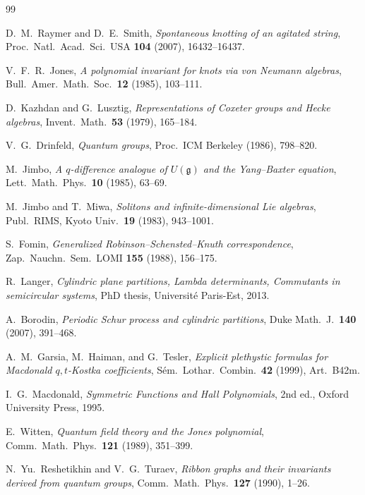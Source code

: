 \documentclass[12pt]{article}
\begin{document}
\begin{thebibliography}{99}

D.~M.~Raymer and D.~E.~Smith,
\emph{Spontaneous knotting of an agitated string},
Proc.\ Natl.\ Acad.\ Sci.\ USA \textbf{104} (2007), 16432--16437.

V.~F.~R.~Jones,
\emph{A polynomial invariant for knots via von Neumann algebras},
Bull.\ Amer.\ Math.\ Soc.\ \textbf{12} (1985), 103--111.

D.~Kazhdan and G.~Lusztig,
\emph{Representations of Coxeter groups and Hecke algebras},
Invent.\ Math.\ \textbf{53} (1979), 165--184.

V.~G.~Drinfeld,
\emph{Quantum groups},
Proc.\ ICM Berkeley (1986), 798--820.

M.~Jimbo,
\emph{A $q$-difference analogue of $U(\mathfrak{g})$ and the Yang--Baxter equation},
Lett.\ Math.\ Phys.\ \textbf{10} (1985), 63--69.

M.~Jimbo and T.~Miwa,
\emph{Solitons and infinite-dimensional Lie algebras},
Publ.\ RIMS, Kyoto Univ.\ \textbf{19} (1983), 943--1001.

S.~Fomin,
\emph{Generalized Robinson--Schensted--Knuth correspondence},
Zap.\ Nauchn.\ Sem.\ LOMI \textbf{155} (1988), 156--175.

R.~Langer,
\emph{Cylindric plane partitions, Lambda determinants, Commutants in semicircular systems},
PhD thesis, Universit\'e Paris-Est, 2013.

A.~Borodin,
\emph{Periodic Schur process and cylindric partitions},
Duke Math.\ J.\ \textbf{140} (2007), 391--468.

A.~M.~Garsia, M.~Haiman, and G.~Tesler,
\emph{Explicit plethystic formulas for Macdonald $q,t$-Kostka coefficients},
S\'em.\ Lothar.\ Combin.\ \textbf{42} (1999), Art.\ B42m.

I.~G.~Macdonald,
\emph{Symmetric Functions and Hall Polynomials},
2nd ed., Oxford University Press, 1995.

E.~Witten,
\emph{Quantum field theory and the Jones polynomial},
Comm.\ Math.\ Phys.\ \textbf{121} (1989), 351--399.

N.~Yu.~Reshetikhin and V.~G.~Turaev,
\emph{Ribbon graphs and their invariants derived from quantum groups},
Comm.\ Math.\ Phys.\ \textbf{127} (1990), 1--26.

\end{thebibliography}
\end{document}
